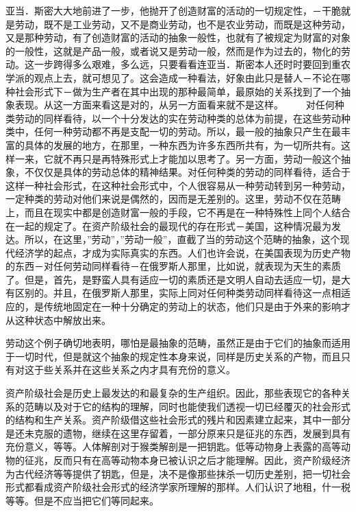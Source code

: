 \documentclass[a4paper,twoside,12pt]{ctexart}
\begin{document}
亚当．斯密大大地前进了一步，他抛开了创造财富的活动的一切规定性，－干脆就是劳动，既不是工业劳动，又不是商业劳动，也不是农业劳动，而既是这种劳动，又是那种劳动，有了创造财富的活动的抽象一般性，也就有了被规定为财富的对象的一般性，这就是产品一般，或者说又是劳动一般，然而是作为过去的，物化的劳动。这一步跨得多么艰难，多么远，只要看看连亚当．斯密本人还时时要回到重农学派的观点上去，就可想见了。这会造成一种看法，好象由此只是替人－不论在哪种社会形式下－做为生产者在其中出现的那种最简单，最原始的关系找到了一个抽象表现。从这一方面来看这是对的，从另一方面看来就不是这样。
　　对任何种类劳动的同样看待，以一个十分发达的实在劳动种类的总体为前提，在这些劳动种类中，任何一种劳动都不再是支配一切的劳动。所以，最一般的抽象只产生在最丰富的具体的发展的地方，在那里，一种东西为许多东西所共有，为一切所共有。这样一来，它就不再只是再特殊形式上才能加以思考了。另一方面，劳动一般这个抽象，不仅仅是具体的劳动总体的精神结果。对任何种类的劳动的同样看待，适合于这样一种社会形式，在这种社会形式中，个人很容易从一种劳动转到另一种劳动，一定种类的劳动对他们来说是偶然的，因而是无差别的。这里，劳动不仅在范畴上，而且在现实中都是创造财富一般的手段，它不再是在一种特殊性上同个人结合在一起的规定了。在资产阶级社会的最现代的存在形式－美国，这种情况最为发达。所以，在这里，”劳动”，”劳动一般”，直截了当的劳动这个范畴的抽象，这个现代经济学的起点，才成为实际真实的东西。人们也许会说，在美国表现为历史产物的东西－对任何劳动同样看待－在俄罗斯人那里，比如说，就表现为天生的素质了。但是，首先，是野蛮人具有适应一切的素质还是文明人自动去适应一切，是大有区别的。并且，在俄罗斯人那里，实际上同对任何种类劳动同样看待这一点相适应的，是传统地固定在一种十分确定的劳动上的状态，他们只是由于外来的影响才从这种状态中解放出来。

劳动这个例子确切地表明，哪怕是最抽象的范畴，虽然正是由于它们的抽象而适用于一切时代，但是就这个抽象的规定性本身来说，同样是历史关系的产物，而且只有对这于些关系并在这些关系之内才具有充份的意义。

资产阶级社会是历史上最发达的和最复杂的生产组织。因此，那些表现它的各种关系的范畴以及对于它的结构的理解，同时也能使我们透视一切已经覆灭的社会形式的结构和生产关系。资产阶级借这些社会形式的残片和因素建立起来，其中一部分是还未克服的遗物，继续在这里存留着，一部分原来只是征兆的东西，发展到具有充份意义，等等。人体解剖对于猴类解剖是一把钥匙。低等动物身上表露的高等动物的征兆，反而只有在高等动物本身已被认识之后才能理解。因此，资产阶级经济为古代经济等等提供了钥匙，但是，决不是像那些抹杀一切历史差别，把一切社会形式都看成资产阶级社会形式的经济学家所理解的那样。人们认识了地租，什一税等等。但是不应当把它们等同起来。
\end{document}
